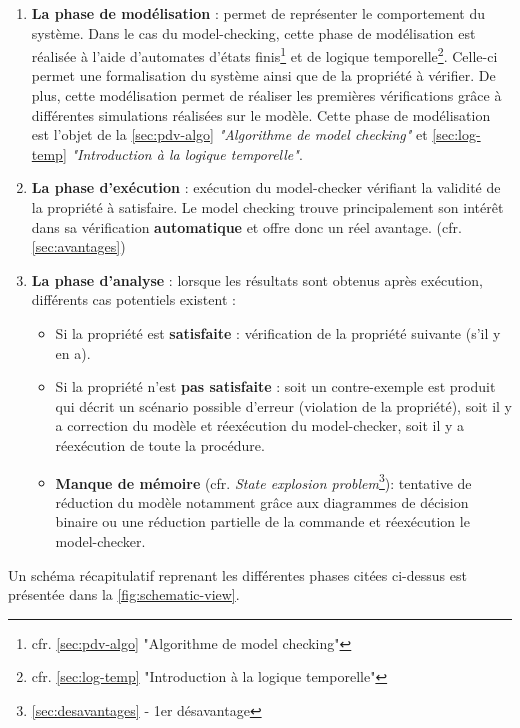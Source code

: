 \documentclass[runningheads,a4paper,10pt]{llncs}
\begin{document}
\begin{enumerate}
 \item  \textbf{La phase de modélisation} : permet de représenter le comportement du système. Dans le cas du model-checking, cette phase de modélisation est réalisée à l'aide d'automates d'états finis\footnote{cfr. \autoref{sec:pdv-algo} "Algorithme de model checking"} et de logique temporelle\footnote{cfr. \autoref{sec:log-temp} "Introduction à la logique temporelle"}. Celle-ci permet une formalisation du système ainsi que de la propriété à vérifier. De plus, cette modélisation permet de réaliser les premières vérifications grâce à différentes simulations réalisées sur le modèle. Cette phase de modélisation est l'objet de la \autoref{sec:pdv-algo} \textit{"Algorithme de model checking"} et \autoref{sec:log-temp} \textit{"Introduction à la logique temporelle"}. 
 \item  \textbf{La phase d'exécution} : exécution du model-checker vérifiant la validité de la propriété à satisfaire. Le model checking trouve principalement son intérêt dans sa vérification \textbf{automatique} et offre donc un réel avantage. (cfr. \autoref{sec:avantages})   
 \item  \textbf{La phase d'analyse} : lorsque les résultats sont obtenus après exécution, différents cas potentiels existent : 
 \begin{itemize}
 \item Si la propriété est \textbf{satisfaite} : vérification de la propriété suivante (s'il y en a). 
 \item Si la propriété n'est \textbf{pas satisfaite} : soit un contre-exemple est produit qui décrit un scénario possible d’erreur (violation de la propriété), soit il y a correction du modèle et réexécution du model-checker, soit il y a réexécution de toute la procédure. 
 \item \textbf{Manque de mémoire} (cfr. \textit{State explosion problem}\footnote{\autoref{sec:desavantages} - 1er désavantage}): tentative de réduction du modèle notamment grâce aux diagrammes de décision binaire ou une réduction partielle de la commande et réexécution le model-checker. 
 \end{itemize}
 \end{enumerate} 
 
Un schéma récapitulatif reprenant les différentes phases citées ci-dessus est présentée dans la \autoref{fig:schematic-view}.
 
\end{document}
